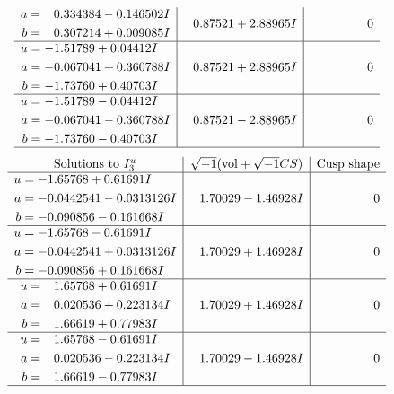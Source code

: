 \documentclass[1p]{elsarticle_modified}
\theoremstyle{definition}
\newcommand{\I}{\sqrt{-1}}
\begin{document}
$$\begin{array}{c|c|c}
\begin{aligned}
a &= \phantom{-}0.334384 - 0.146502 I \\
b &= \phantom{-}0.307214 + 0.009085 I\end{aligned}
 & \phantom{-}0.87521 + 2.88965 I & \phantom{-0.000000 } 0 \\ \hline\begin{aligned}
u &= -1.51789 + 0.04412 I \\
a &= -0.067041 + 0.360788 I \\
b &= -1.73760 + 0.40703 I\end{aligned}
 & \phantom{-}0.87521 + 2.88965 I & \phantom{-0.000000 } 0 \\ \hline\begin{aligned}
u &= -1.51789 - 0.04412 I \\
a &= -0.067041 - 0.360788 I \\
b &= -1.73760 - 0.40703 I\end{aligned}
 & \phantom{-}0.87521 - 2.88965 I & \phantom{-0.000000 } 0\\
 \hline 
 \end{array}$$\newpage$$\begin{array}{c|c|c}  
\text{Solutions to }I^u_{3}& \I (\text{vol} + \sqrt{-1}CS) & \text{Cusp shape}\\
 \hline 
\begin{aligned}
u &= -1.65768 + 0.61691 I \\
a &= -0.0442541 - 0.0313126 I \\
b &= -0.090856 - 0.161668 I\end{aligned}
 & \phantom{-}1.70029 - 1.46928 I & \phantom{-0.000000 } 0 \\ \hline\begin{aligned}
u &= -1.65768 - 0.61691 I \\
a &= -0.0442541 + 0.0313126 I \\
b &= -0.090856 + 0.161668 I\end{aligned}
 & \phantom{-}1.70029 + 1.46928 I & \phantom{-0.000000 } 0 \\ \hline\begin{aligned}
u &= \phantom{-}1.65768 + 0.61691 I \\
a &= \phantom{-}0.020536 + 0.223134 I \\
b &= \phantom{-}1.66619 + 0.77983 I\end{aligned}
 & \phantom{-}1.70029 + 1.46928 I & \phantom{-0.000000 } 0 \\ \hline\begin{aligned}
u &= \phantom{-}1.65768 - 0.61691 I \\
a &= \phantom{-}0.020536 - 0.223134 I \\
b &= \phantom{-}1.66619 - 0.77983 I\end{aligned}
 & \phantom{-}1.70029 - 1.46928 I & \phantom{-0.000000 } 0\\
 \hline 
 \end{array}$$\newpage\newpage\renewcommand{\arraystretch}{1}
\end{document}
